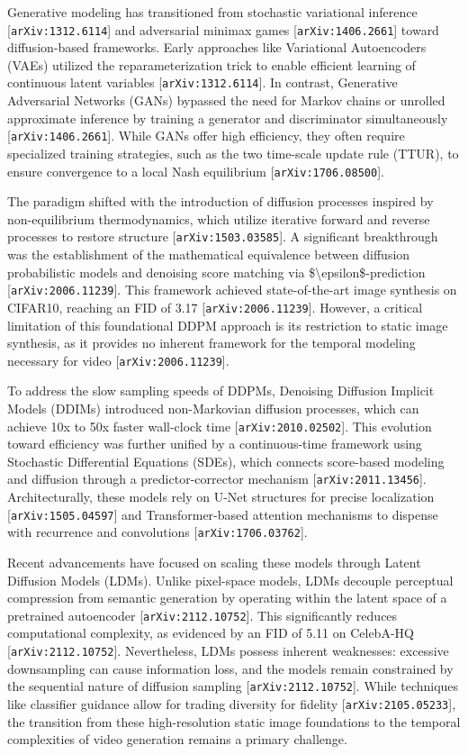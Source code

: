 \documentclass[11pt]{article}
\begin{document}
Generative modeling has transitioned from stochastic variational inference [\texttt{arXiv:1312.6114}] and adversarial minimax games [\texttt{arXiv:1406.2661}] toward diffusion-based frameworks. Early approaches like Variational Autoencoders (VAEs) utilized the reparameterization trick to enable efficient learning of continuous latent variables [\texttt{arXiv:1312.6114}]. In contrast, Generative Adversarial Networks (GANs) bypassed the need for Markov chains or unrolled approximate inference by training a generator and discriminator simultaneously [\texttt{arXiv:1406.2661}]. While GANs offer high efficiency, they often require specialized training strategies, such as the two time-scale update rule (TTUR), to ensure convergence to a local Nash equilibrium [\texttt{arXiv:1706.08500}].

The paradigm shifted with the introduction of diffusion processes inspired by non-equilibrium thermodynamics, which utilize iterative forward and reverse processes to restore structure [\texttt{arXiv:1503.03585}]. A significant breakthrough was the establishment of the mathematical equivalence between diffusion probabilistic models and denoising score matching via \$\textbackslash{}epsilon\$-prediction [\texttt{arXiv:2006.11239}]. This framework achieved state-of-the-art image synthesis on CIFAR10, reaching an FID of 3.17 [\texttt{arXiv:2006.11239}]. However, a critical limitation of this foundational DDPM approach is its restriction to static image synthesis, as it provides no inherent framework for the temporal modeling necessary for video [\texttt{arXiv:2006.11239}].

To address the slow sampling speeds of DDPMs, Denoising Diffusion Implicit Models (DDIMs) introduced non-Markovian diffusion processes, which can achieve 10x to 50x faster wall-clock time [\texttt{arXiv:2010.02502}]. This evolution toward efficiency was further unified by a continuous-time framework using Stochastic Differential Equations (SDEs), which connects score-based modeling and diffusion through a predictor-corrector mechanism [\texttt{arXiv:2011.13456}]. Architecturally, these models rely on U-Net structures for precise localization [\texttt{arXiv:1505.04597}] and Transformer-based attention mechanisms to dispense with recurrence and convolutions [\texttt{arXiv:1706.03762}].

Recent advancements have focused on scaling these models through Latent Diffusion Models (LDMs). Unlike pixel-space models, LDMs decouple perceptual compression from semantic generation by operating within the latent space of a pretrained autoencoder [\texttt{arXiv:2112.10752}]. This significantly reduces computational complexity, as evidenced by an FID of 5.11 on CelebA-HQ [\texttt{arXiv:2112.10752}]. Nevertheless, LDMs possess inherent weaknesses: excessive downsampling can cause information loss, and the models remain constrained by the sequential nature of diffusion sampling [\texttt{arXiv:2112.10752}]. While techniques like classifier guidance allow for trading diversity for fidelity [\texttt{arXiv:2105.05233}], the transition from these high-resolution static image foundations to the temporal complexities of video generation remains a primary challenge.
\end{document}
